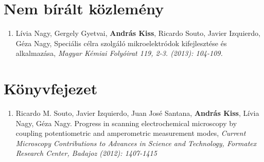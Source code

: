 \documentclass[11pt,a4paper,roman]{article}
\begin{document}
\section{Nem bírált közlemény}
\begin{enumerate}
\item Lívia Nagy, Gergely Gyetvai, \textbf{András Kiss}, Ricardo Souto, Javier Izquierdo, Géza Nagy, Speciális célra szolgáló mikroelektródok kifejlesztése és alkalmazása, \emph{Magyar Kémiai Folyóirat 119, 2-3. (2013): 104-109.}
\end{enumerate}

\section{Könyvfejezet}
\begin{enumerate}
\item Ricardo M. Souto, Javier Izquierdo, Juan José Santana, \textbf{András Kiss}, Lívia Nagy, Géza Nagy. Progress in scanning electrochemical microscopy by coupling potentiometric and amperometric measurement modes, \emph{Current Microscopy Contributions to Advances in Science and Technology, Formatex Research Center, Badajoz (2012): 1407-1415}
\end{enumerate}
\end{document}
